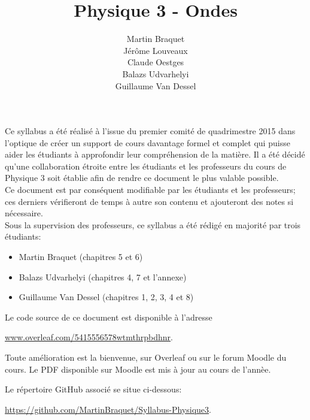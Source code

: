 \documentclass[a4paper,justified,openany]{tufte-book}
\begin{document}
	
	\title{Physique 3 - Ondes}
	\author{Martin Braquet\\Jérôme Louveaux\\Claude Oestges\\Balazs Udvarhelyi\\Guillaume Van Dessel}
	
	\newcommand{\monthyear}{%
		\ifcase\month\or January\or February\or March\or April\or May\or June\or
		July\or August\or September\or October\or November\or
		December\fi\space\number\year
	}
    
	\maketitle
	\vfill
	\begin{fullwidth}
		Ce syllabus a été réalisé à l'issue du premier comité de quadrimestre 2015 dans l'optique de créer un support de cours davantage formel et complet qui puisse aider les étudiants à approfondir leur compréhension de la matière. Il a été décidé qu'une collaboration étroite entre les étudiants et les professeurs du cours de Physique 3 soit établie afin de rendre ce document 
		le plus valable possible. \\
		Ce document est par conséquent modifiable par les étudiants et les professeurs; ces derniers vérifieront de temps à autre 
		son contenu et ajouteront des notes si nécessaire. \\
		Sous la supervision des professeurs, ce syllabus a été rédigé en majorité par trois étudiants: 
		\begin{itemize}
		 \item Martin Braquet (chapitres 5 et 6)
		 \item Balazs Udvarhelyi (chapitres 4, 7 et l'annexe)
		 \item Guillaume Van Dessel (chapitres 1, 2, 3, 4 et 8)
		\end{itemize}
	\end{fullwidth}
	\vspace{2cm}
	\begin{fullwidth}
        Le code source de ce document est disponible à l'adresse
		\begin{center}
            \url{www.overleaf.com/5415556578wtmthrpbdhnr}.
        \end{center}
		Toute amélioration est la bienvenue, sur Overleaf ou sur le forum Moodle du cours. Le PDF disponible sur Moodle est mis à jour au cours de l'annèe.
		
		Le répertoire GitHub associé se situe ci-dessous:
		\begin{center}
            \url{https://github.com/MartinBraquet/Syllabus-Physique3}.
        \end{center}
    \end{fullwidth}
\end{document}
